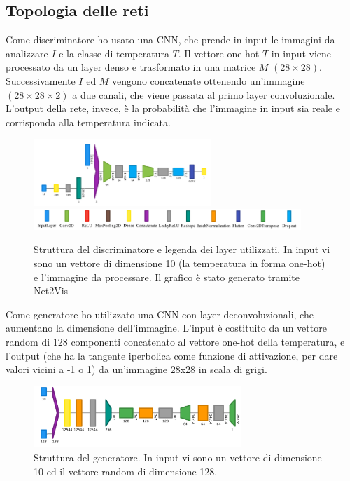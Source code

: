 \documentclass[a4paper]{article}
\begin{document}
\subsection{Topologia delle reti}
Come discriminatore ho usato una CNN, che prende in input le immagini da analizzare $I$ e la classe di temperatura $T$. Il vettore one-hot $T$ in input viene processato da un layer denso e trasformato in una matrice $M$ $(28\times28)$. Successivamente $I$ ed $M$ vengono concatenate ottenendo un'immagine $(28\times28\times2)$ a due canali, che viene passata al primo layer convoluzionale. L'output della rete, invece, è la probabilità che l'immagine in input sia reale e corrisponda alla temperatura indicata. 
\begin{figure}[H]
\includegraphics[width=0.6\textwidth]{dis.png}\\
\includegraphics[width=0.9\textwidth]{legend.jpg}
\centering
\caption{Struttura del discriminatore e legenda dei layer utilizzati. In input vi sono un vettore di dimensione 10 (la temperatura in forma one-hot) e l'immagine da processare. Il grafico è stato generato tramite Net2Vis \cite{net2vis}}\end{figure}
Come generatore ho utilizzato una CNN con layer deconvoluzionali, che aumentano la dimensione dell'immagine. L'input è costituito da un vettore random di 128 componenti concatenato al vettore one-hot della temperatura, e l'output (che ha la tangente iperbolica come funzione di attivazione, per dare valori vicini a -1 o 1) da un'immagine 28x28 in scala di grigi.
\begin{figure}[H]
\includegraphics[width=0.7\textwidth]{gen.png}
\centering
\caption{Struttura del generatore. In input vi sono un vettore di dimensione 10 ed il vettore random di dimensione 128.}
\end{figure}
\end{document}
